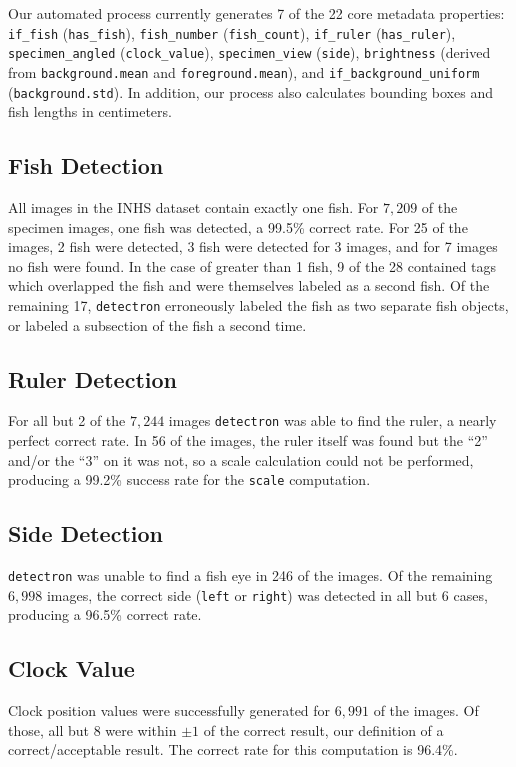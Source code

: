 \documentclass[conference]{IEEEtran}
\begin{document}
Our automated process currently generates 7 of the 22 core metadata properties: \verb|if_fish| (\verb|has_fish|), \verb|fish_number| (\verb|fish_count|), \verb|if_ruler| (\verb|has_ruler|), \verb|specimen_angled| (\verb|clock_value|), \verb|specimen_view| (\verb|side|), \verb|brightness| (derived from \verb|background.mean| and \verb|foreground.mean|), and \verb|if_background_uniform| (\verb|background.std|). In addition, our process also calculates bounding boxes and fish lengths in centimeters.

\subsection{Fish Detection}
All images in the INHS dataset contain exactly one fish. For \(7,209\) of the specimen images, one fish was detected, a 99.5\% correct rate.
For 25 of the images, 2 fish were detected, 3 fish were detected for 3 images, and for 7 images no fish were found. In the case of greater than 1 fish, 9 of the 28 contained tags which overlapped the fish and were themselves labeled as a second fish. Of the remaining 17, \verb|detectron| erroneously labeled the fish as two separate fish objects, or labeled a subsection of the fish a second time.

\subsection{Ruler Detection}
For all but 2 of the \(7,244\) images \verb|detectron| was able to find the ruler, a nearly perfect correct rate.
In 56 of the images, the ruler itself was found but the ``2'' and/or the ``3'' on it was not, so a scale calculation could not be performed, producing a 99.2\% success rate for
the \verb|scale| computation.

\subsection{Side Detection}
\verb|detectron| was unable to find a fish eye
in 246 of the images. Of the remaining \(6,998\) images, the correct side
(\verb|left| or \verb|right|) was detected in all but 6 cases, producing
a 96.5\% correct rate.

\subsection{Clock Value}
Clock position values were successfully generated for \(6,991\) of the images. Of those, all but 8 were within \(\pm{}1\) of the correct result,
our definition of a correct/acceptable result. The correct rate for this
computation is 96.4\%.
\end{document}
